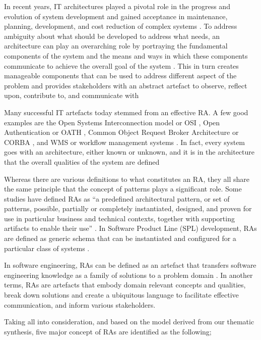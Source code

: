 \documentclass[review]{elsarticle}
\begin{document}
In recent years, IT architectures played a pivotal role in the progress and evolution of system development and gained acceptance in maintenance, planning, development, and cost reduction of complex systems \cite{martinez2015solid}. To address ambiguity about what should be developed to address what needs, an architecture can play an overarching role by portraying the fundamental components of the system and the means and ways in which these components communicate to achieve the overall goal of the system \cite{Sievi-Korte}. This in turn creates manageable components that can be used to address different aspect of the problem and provides stakeholders with an abstract artefact to observe, reflect upon, contribute to, and communicate with \cite{kohler2019towards}

Many successful IT artefacts today stemmed from an effective RA. A few good examples are the Open Systems Interconnection model or OSI \cite{zimmermann1980osi}, Open Authentication or OATH \cite{OATH}, Common Object Request Broker Architecture or CORBA \cite{pope1998corba}, and WMS or workflow management systems \cite{greefhorst1999een}. In fact, every system goes with an architecture, either known or unknown, and it is in the architecture that the overall qualities of the system are defined

Whereas there are various definitions to what constitutes an RA, they all share the same principle that the concept of patterns plays a significant role. Some studies have defined RAs as “a predefined architectural pattern, or set of patterns, possible, partially or completely instantiated, designed, and proven for use in particular business and technical contexts, together with supporting artifacts to enable their use” \cite{Cloutier}. In Software Product Line (SPL) development, RAs are defined as generic schema that can be instantiated and configured for a particular class of systems \cite{Derras}.

In software engineering, RAs can be defined as an artefact that transfers software engineering knowledge as a family of solutions to a problem domain \cite{Klein}. In another terms, RAs are artefacts that embody domain relevant concepts and qualities, break down solutions and create a ubiquitous language to facilitate effective communication, and inform various stakeholders. 

Taking all into consideration, and based on the model derived from our thematic synthesis, five major concept of RAs are identified as the following; 
\end{document}
